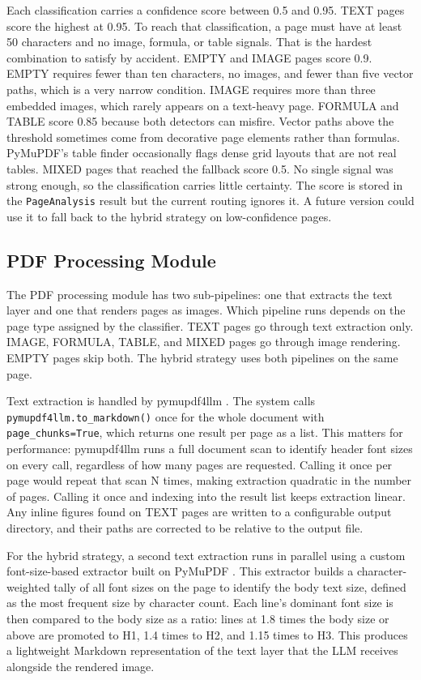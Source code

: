 \documentclass[12pt]{article}
\begin{document}
Each classification carries a confidence score between 0.5 and 0.95.
TEXT pages score the highest at 0.95. To reach that classification, a page must have at least 50 characters and no image, formula, or table signals. That is the hardest combination to satisfy by accident.
EMPTY and IMAGE pages score 0.9. EMPTY requires fewer than ten characters, no images, and fewer than five vector paths, which is a very narrow condition. IMAGE requires more than three embedded images, which rarely appears on a text-heavy page.
FORMULA and TABLE score 0.85 because both detectors can misfire. Vector paths above the threshold sometimes come from decorative page elements rather than formulas. PyMuPDF's table finder occasionally flags dense grid layouts that are not real tables.
MIXED pages that reached the fallback score 0.5. No single signal was strong enough, so the classification carries little certainty.
The score is stored in the \texttt{PageAnalysis} result but the current routing ignores it. A future version could use it to fall back to the hybrid strategy on low-confidence pages.

\subsection{PDF Processing Module}

The PDF processing module has two sub-pipelines: one that extracts the text layer and one that renders pages as images.
Which pipeline runs depends on the page type assigned by the classifier.
TEXT pages go through text extraction only. IMAGE, FORMULA, TABLE, and MIXED pages go through image rendering. EMPTY pages skip both.
The hybrid strategy uses both pipelines on the same page.

Text extraction is handled by pymupdf4llm \cite{pymupdf4llm}.
The system calls \texttt{pymupdf4llm.to\_markdown()} once for the whole document with \texttt{page\_chunks=True}, which returns one result per page as a list.
This matters for performance: pymupdf4llm runs a full document scan to identify header font sizes on every call, regardless of how many pages are requested.
Calling it once per page would repeat that scan N times, making extraction quadratic in the number of pages.
Calling it once and indexing into the result list keeps extraction linear.
Any inline figures found on TEXT pages are written to a configurable output directory, and their paths are corrected to be relative to the output file.

For the hybrid strategy, a second text extraction runs in parallel using a custom font-size-based extractor built on PyMuPDF \cite{pymupdf}.
This extractor builds a character-weighted tally of all font sizes on the page to identify the body text size, defined as the most frequent size by character count.
Each line's dominant font size is then compared to the body size as a ratio: lines at 1.8 times the body size or above are promoted to H1, 1.4 times to H2, and 1.15 times to H3.
This produces a lightweight Markdown representation of the text layer that the LLM receives alongside the rendered image.
\end{document}
